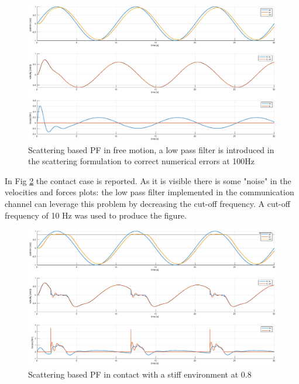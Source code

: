 \documentclass[a4paper,12pt]{article}
\begin{document}
\begin{figure}[H]
    \begin{center}
        \hspace*{-4.5cm}
        \includegraphics[scale=0.5]{images/scat_pf_free.eps}
    \end{center}
    \caption{Scattering based PF in free motion, a low pass filter is introduced in the scattering formulation to correct numerical errors at 100Hz}
    \label{fig:scat_pf_free}
\end{figure}

\newpage
In Fig \ref{fig:scat_pf_contact} the contact case is reported. As it is visible there is some "noise" in the velocities and forces plots: the low pass filter implemented in the communication channel can leverage this problem by decreasing the cut-off frequency. A cut-off frequency of 10 Hz was used to produce the figure.

\begin{figure}[H]
    \begin{center}
        \hspace*{-4.5cm}
        \includegraphics[scale=0.5]{images/scat_pf_contact.eps}
    \end{center}
    \caption{Scattering based PF in contact with a stiff environment at 0.8}
    \label{fig:scat_pf_contact}
\end{figure}
\end{document}

